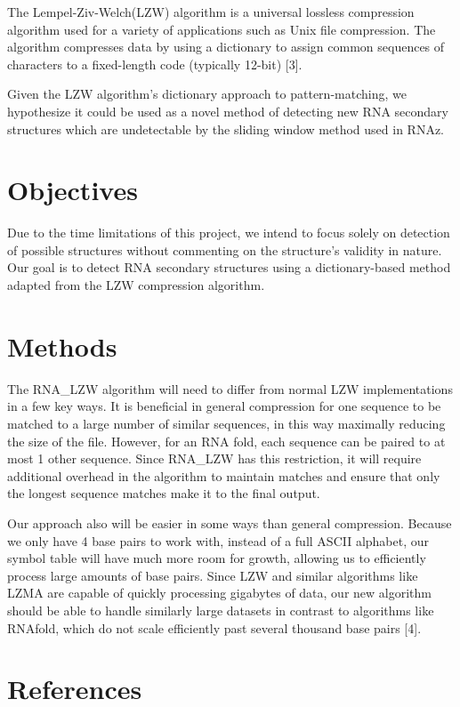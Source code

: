 \documentclass[letterpaper, 12pt]{artikel3}
\begin{document}
The Lempel-Ziv-Welch(LZW) algorithm is a universal lossless compression algorithm used for a variety of applications such as Unix file compression. The algorithm compresses data by using a dictionary to assign common sequences of characters to a fixed-length code (typically 12-bit) [3].

Given the LZW algorithm's dictionary approach to pattern-matching, we hypothesize it could be used as a novel method of detecting new RNA secondary structures which are undetectable by the sliding window method used in RNAz. 

\vspace{-10mm}
\section*{Objectives}
Due to the time limitations of this project, we intend to focus solely on detection of possible structures without commenting on the structure's validity in nature.  Our goal is to detect RNA secondary structures using a dictionary-based method adapted from the LZW compression algorithm.
\vspace{-10mm}
\section*{Methods}

The RNA\_LZW algorithm will need to differ from normal LZW implementations in a few key ways. It is beneficial in general compression for one sequence to be matched to a large number of similar sequences, in this way maximally reducing the size of the file. However, for an RNA fold, each sequence can be paired to at most 1 other sequence. Since RNA\_LZW has this restriction, it will require additional overhead in the algorithm to maintain matches and ensure that only the longest sequence matches make it to the final output. 

Our approach also will be easier in some ways than general compression. Because we only have 4 base pairs to work with, instead of a full ASCII alphabet, our symbol table will have much more room for growth, allowing us to efficiently process large amounts of base pairs. Since LZW and similar algorithms like LZMA are capable of quickly processing gigabytes of data, our new algorithm should be able to handle similarly large datasets in contrast to algorithms like RNAfold, which do not scale efficiently past several thousand base pairs [4].

\section*{References}
\end{document}
